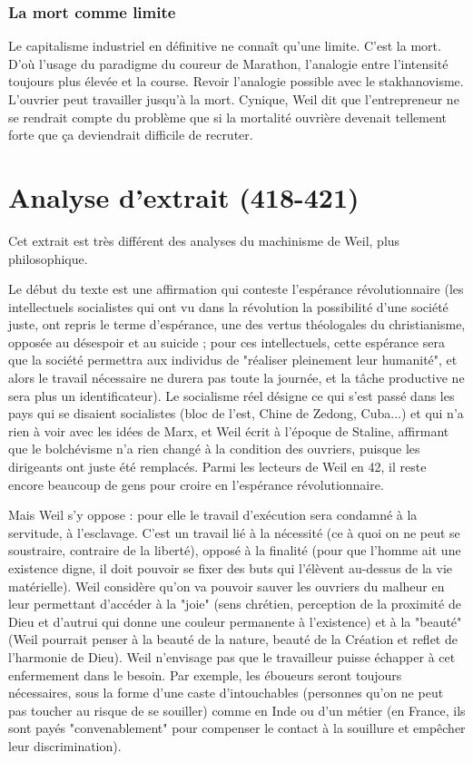 \documentclass[a4paper,12pt]{book}
\begin{document}
\subsubsection{La mort comme limite}
Le capitalisme industriel en définitive ne connaît qu'une limite. C'est la mort. D'où l'usage du paradigme du coureur de Marathon, l'analogie entre l'intensité toujours plus élevée et la course. Revoir l'analogie possible avec le stakhanovisme. L'ouvrier peut travailler jusqu'à la mort. Cynique, Weil dit que l'entrepreneur ne se rendrait compte du problème que si la mortalité ouvrière devenait tellement forte que ça deviendrait difficile de recruter.

\section{Analyse d'extrait (418-421)}
Cet extrait est très différent des analyses du machinisme de Weil, plus philosophique.
\par Le début du texte est une affirmation qui conteste l'espérance révolutionnaire (les intellectuels socialistes qui ont vu dans la révolution la possibilité d'une société juste, ont repris le terme d'espérance, une des vertus théologales du christianisme, opposée au désespoir et au suicide ; pour ces intellectuels, cette espérance sera que la société permettra aux individus de "réaliser pleinement leur humanité", et alors le travail nécessaire ne durera pas toute la journée, et la tâche productive ne sera plus un identificateur). Le socialisme réel désigne ce qui s'est passé dans les pays qui se disaient socialistes (bloc de l'est, Chine de Zedong, Cuba...) et qui n'a rien à voir avec les idées de Marx, et Weil écrit à l'époque de Staline, affirmant que le bolchévisme n'a rien changé à la condition des ouvriers, puisque les dirigeants ont juste été remplacés. Parmi les lecteurs de Weil en 42, il reste encore beaucoup de gens pour croire en l'espérance révolutionnaire.
\par Mais Weil s'y oppose : pour elle le travail d'exécution sera condamné à la servitude, à l'esclavage. C'est un travail lié à la nécessité (ce à quoi on ne peut se soustraire, contraire de la liberté), opposé à la finalité (pour que l'homme ait une existence digne, il doit pouvoir se fixer des buts qui l'élèvent au-dessus de la vie matérielle). Weil considère qu'on va pouvoir sauver les ouvriers du malheur en leur permettant d'accéder à la "joie" (sens chrétien, perception de la proximité de Dieu et d'autrui qui donne une couleur permanente à l'existence) et à la "beauté" (Weil pourrait penser à la beauté de la nature, beauté de la Création et reflet de l'harmonie de Dieu). Weil n'envisage pas que le travailleur puisse échapper à cet enfermement dans le besoin. Par exemple, les éboueurs seront toujours nécessaires, sous la forme d'une caste d'intouchables (personnes qu'on ne peut pas toucher au risque de se souiller) comme en Inde ou d'un métier (en France, ils sont payés "convenablement" pour compenser le contact à la souillure et empêcher leur discrimination).
\end{document}
